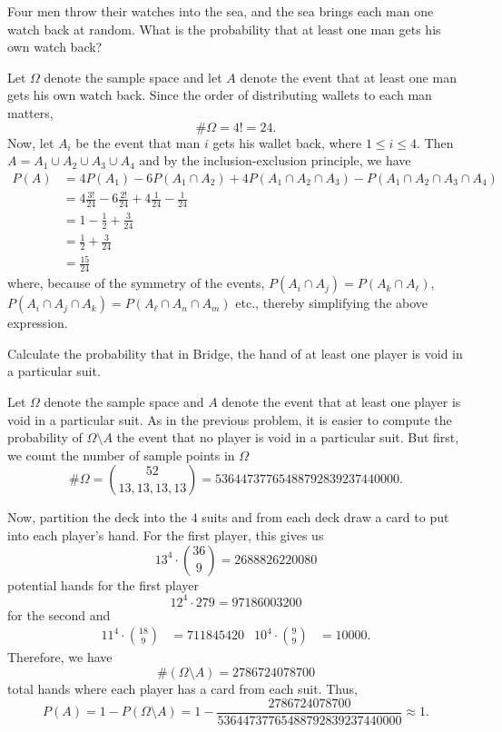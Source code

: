 \begin{problem}[Handout 2, \# 5]
  Four men throw their watches into the sea, and the sea brings each man
  one watch back at random. What is the probability that at least one man
  gets his own watch back?
\end{problem}
\begin{solution}
  Let \(\Omega\) denote the sample space and let \(A\) denote the event
  that at least one man gets his own watch back. Since the order of
  distributing wallets to each man matters,
  \[
    \#\Omega=4!=24.
  \]
  Now, let \(A_i\) be the event that man \(i\) gets his wallet back, where
  \(1\leq i\leq 4\). Then \(A=A_1\cup A_2\cup A_3\cup A_4\) and by the
  inclusion-exclusion principle, we have
  \begin{align*}
    P(A)
    &=4P(A_1)-6P(A_1\cap A_2)+4P(A_1\cap A_2\cap A_3)-P(A_1\cap A_2\cap
      A_3\cap A_4)\\
    &=4\frac{3!}{24}-6\frac{2!}{24}+4\frac{1}{24}-\frac{1}{24}\\
    &=1-\frac{1}{2}+\frac{3}{24}\\
    &=\frac{1}{2}+\frac{3}{24}\\
    &=\frac{15}{24}
  \end{align*}
  where, because of the symmetry of the events,
  \(P(A_i\cap A_j)=P(A_k\cap A_\ell)\),
  \(P(A_i\cap A_j\cap A_k)=P(A_\ell\cap A_n\cap A_m)\) etc., thereby
  simplifying the above expression.
\end{solution}
\newpage

\begin{problem}[Handout 2, \# 7]
  Calculate the probability that in Bridge, the hand of at least one player
  is void in a particular suit.
\end{problem}
\begin{solution}
  Let \(\Omega\) denote the sample space and \(A\) denote the event that at
  least one player is void in a particular suit. As in the previous
  problem, it is easier to compute the probability of \(\Omega\setminus A\)
  the event that no player is void in a particular suit. But first, we
  count the number of sample points in \(\Omega\)
  \[
    \#\Omega=\binom{52}{13,13,13,13}
    =53644737765488792839237440000.
  \]

  Now, partition the deck into the \(4\) suits and from each deck draw a
  card to put into each player's hand. For the first player, this gives us
  \[
    13^4\cdot\binom{36}{9}=2688826220080
  \]
  potential hands for the first player
  \[
    12^4\cdot{27}{9}=97186003200
  \]
  for the second and
  \begin{align*}
    11^4\cdot\binom{18}{9}&=711845420
    &10^4\cdot\binom{9}{9}&=10000.
  \end{align*}
  Therefore, we have
  \[
    \#(\Omega\setminus A)=2786724078700
  \]
  total hands where each player has a card from each suit. Thus,
  \[
    P(A)=1-P(\Omega\setminus
    A)=1-\frac{2786724078700}{53644737765488792839237440000}\approx 1.
  \]
\end{solution}
\newpage

